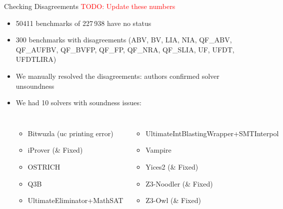 \documentclass[table]{beamer}
\newcommand\vitem{\vfill\item}
\begin{document}
\begin{frame}{Checking Disagreements}
  \textcolor{red}{TODO: Update these numbers}
  
  \begin{itemize}
  \item  50411 benchmarks of 227\,938 have no status

  \vitem 300 benchmarks with disagreements (ABV,
  BV,
  LIA,
  NIA,
  QF\_ABV,
  QF\_AUFBV,
  QF\_BVFP,
  QF\_FP,
  QF\_NRA,
  QF\_SLIA,
  UF,
  UFDT,
  UFDTLIRA)

  \vitem We manually resolved the disagreements: authors confirmed solver
  unsoundness
  \vitem We had 10 solvers with soundness issues:
  \begin{columns}
    \begin{itemize}
      \item Bitwuzla (uc printing error)
      \item iProver (\& Fixed)
      \item OSTRICH
      \item Q3B
      \item UltimateEliminator+MathSAT
    \end{itemize}
    \begin{itemize}
      \item UltimateIntBlastingWrapper+SMTInterpol
      \item Vampire
      \item Yices2 (\& Fixed)
      \item Z3-Noodler (\& Fixed)
      \item Z3-Owl (\& Fixed)
    \end{itemize}
\end{columns}

  \end{itemize}
  \end{frame}


\end{document}
